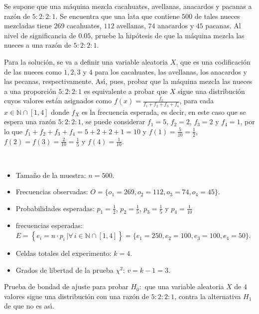 \begin{enunciado}
 Se supone que una m\'aquina mezcla cacahuates, avellanas, anacardos y pacanas
 a raz\'on de $5:2:2:1$.
 Se encuentra que una lata que contiene $500$ de tales nueces mezcladas tiene
 $269$ cacahuates, $112$ avellanas, $74$ anacardos y $45$ pacanas.
 Al nivel de significancia de $0.05$, pruebe la hip\'otesis
 de que la m\'aquina mezcla las nueces a una raz\'on de $5:2:2:1$.
\end{enunciado}

\begin{solucion}
 Para la soluci\'on, se va a definir una variable aleatoria $X$,
 que es una codificaci\'on de las nueces como $1,2,3$ y $4$
 para los cacahuates, las avellanas, los anacardos y las pecanas,
 respectivamente.
 As\'{\i}, pues, probar que la m\'aquina mezcla las nueces a una proporci\'on
 $5:2:2:1$ es equivalente a probar que $X$ sigue una distribuci\'on
 cuyos valores est\'an asignados como
 $f(x) = \frac{f_x}{f_1+f_2+f_3+f_4}$,
 para cada $x\in\mathbb{N}\cap[1,4]$ donde $f_X$
 es la frecuencia esperada, es decir,
 en este caso que se espera una raz\'on $5:2:2:1$, se puede 
 considerar $f_1=5$, $f_2=2$, $f_3=2$ y $f_4=1$,
 por lo que $f_1+f_2+f_3+f_4=5+2+2+1=10$ y
 $f(1)=\frac{5}{10}=\frac{1}{2}$,
 $f(2)=f(3)=\frac{2}{10}=\frac{1}{5}$
 y $f(4)=\frac{1}{10}$. 
 \begin{datos}
  $\phantom{0}$
  \begin{itemize}
   \item Tama\~no de la muestra: $n=500$.
   \item Frecuencias observadas:
   $O = \{ o_1 = 269, o_2 = 112, o_3 = 74, o_4 = 45 \}$.
   \item Probabilidades esperadas: $p_1 = \frac{1}{2}$,
   $p_2 = \frac{1}{5}$, $p_3 = \frac{1}{5}$ y $p_4 = \frac{1}{10}$
   \item frecuencias esperadas:
   $E = \left\{ e_i=n\cdot p_i \, | \forall\, i\in\mathbb{N}\cap[1,4] \right\} = \{ e_1 = 250, e_2 = 100, e_3 = 100, e_4 = 50 \}$.
   \item Celdas totales del experimento: $k=4$.
   \item Grados de libertad de la prueba $\chi^2$: $v = k-1 = 3$.
  \end{itemize}
 \end{datos}

 \begin{hipotesis}
  Prueba de bondad de ajuste para probar $H_0:$
  que una variable aleatoria $X$ de $4$ valores sigue una distribuci\'on
  con una raz\'on de $5:2:2:1$,
  contra la alternativa $H_1$ de que no es as\'{\i}.
 \end{hipotesis}


\end{solucion}

